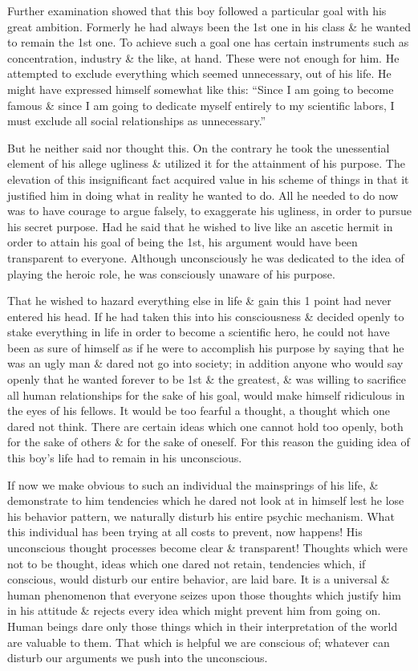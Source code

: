 \documentclass{article}
\begin{document}
Further examination showed that this boy followed a particular goal with his great ambition. Formerly he had always been the 1st one in his class \& he wanted to remain the 1st one. To achieve such a goal one has certain instruments such as concentration, industry \& the like, at hand. These were not enough for him. He attempted to exclude everything which seemed unnecessary, out of his life. He might have expressed himself somewhat like this: ``Since I am going to become famous \& since I am going to dedicate myself entirely to my scientific labors, I must exclude all social relationships as unnecessary.''

But he neither said nor thought this. On the contrary he took the unessential element of his allege ugliness \& utilized it for the attainment of his purpose. The elevation of this insignificant fact acquired value in his scheme of things in that it justified him in doing what in reality he wanted to do. All he needed to do now was to have courage to argue falsely, to exaggerate his ugliness, in order to pursue his secret purpose. Had he said that he wished to live like an ascetic hermit in order to attain his goal of being the 1st, his argument would have been transparent to everyone. Although unconsciously he was dedicated to the idea of playing the heroic role, he was consciously unaware of his purpose.

That he wished to hazard everything else in life \& gain this 1 point had never entered his head. If he had taken this into his consciousness \& decided openly to stake everything in life in order to become a scientific hero, he could not have been as sure of himself as if he were to accomplish his purpose by saying that he was an ugly man \& dared not go into society; in addition anyone who would say openly that he wanted forever to be 1st \& the greatest, \& was willing to sacrifice all human relationships for the sake of his goal, would make himself ridiculous in the eyes of his fellows. It would be too fearful a thought, a thought which one dared not think. There are certain ideas which one cannot hold too openly, both for the sake of others \& for the sake of oneself. For this reason the guiding idea of this boy's life had to remain in his unconscious.

If now we make obvious to such an individual the mainsprings of his life, \& demonstrate to him tendencies which he dared not look at in himself lest he lose his behavior pattern, we naturally disturb his entire psychic mechanism. What this individual has been trying at all costs to prevent, now happens! His unconscious thought processes become clear \& transparent! Thoughts which were not to be thought, ideas which one dared not retain, tendencies which, if conscious, would disturb our entire behavior, are laid bare. It is a universal \& human phenomenon that everyone seizes upon those thoughts which justify him in his attitude \& rejects every idea which might prevent him from going on. Human beings dare only those things which in their interpretation of the world are valuable to them. That which is helpful we are conscious of; whatever can disturb our arguments we push into the unconscious.
\end{document}
